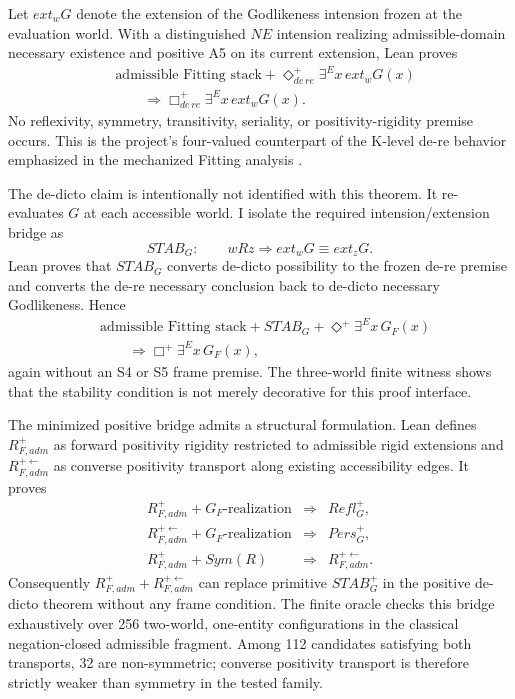Let \(ext_wG\) denote the extension of the Godlikeness intension frozen at the evaluation world. With a distinguished \(NE\) intension realizing admissible-domain necessary existence and positive A5 on its current extension, Lean proves
\[
\begin{split}
  &\text{admissible Fitting stack}
  +\Diamond_{de\,re}^+\exists^E x\,ext_wG(x)\\
  &\qquad\Longrightarrow
  \Box_{de\,re}^+\exists^E x\,ext_wG(x).
\end{split}
\]
No reflexivity, symmetry, transitivity, seriality, or positivity-rigidity premise occurs. This is the project's four-valued counterpart of the K-level de-re behavior emphasized in the mechanized Fitting analysis \cite{BenzmuellerFuenmayor2019}.

The de-dicto claim is intentionally not identified with this theorem. It re-evaluates \(G\) at each accessible world. I isolate the required intension/extension bridge as
\[
  STAB_G:\qquad
  wRz\Rightarrow ext_wG\equiv ext_zG.
\]
Lean proves that \(STAB_G\) converts de-dicto possibility to the frozen de-re premise and converts the de-re necessary conclusion back to de-dicto necessary Godlikeness. Hence
\[
\begin{split}
  &\text{admissible Fitting stack}
  +STAB_G
  +\Diamond^+\exists^E x\,G_F(x)\\
  &\qquad\Longrightarrow
  \Box^+\exists^E x\,G_F(x),
\end{split}
\]
again without an S4 or S5 frame premise. The three-world finite witness shows that the stability condition is not merely decorative for this proof interface.

The minimized positive bridge admits a structural formulation. Lean defines \(R_{F,adm}^+\) as forward positivity rigidity restricted to admissible rigid extensions and \(R_{F,adm}^{+\leftarrow}\) as converse positivity transport along existing accessibility edges. It proves
\[
\begin{array}{rcl}
R_{F,adm}^++G_F\text{-realization}&\Longrightarrow&Refl_G^+,\\
R_{F,adm}^{+\leftarrow}+G_F\text{-realization}&\Longrightarrow&Pers_G^+,\\
R_{F,adm}^++Sym(R)&\Longrightarrow&R_{F,adm}^{+\leftarrow}.
\end{array}
\]
Consequently \(R_{F,adm}^++R_{F,adm}^{+\leftarrow}\) can replace primitive \(STAB_G^+\) in the positive de-dicto theorem without any frame condition. The finite oracle checks this bridge exhaustively over 256 two-world, one-entity configurations in the classical negation-closed admissible fragment. Among 112 candidates satisfying both transports, 32 are non-symmetric; converse positivity transport is therefore strictly weaker than symmetry in the tested family.
